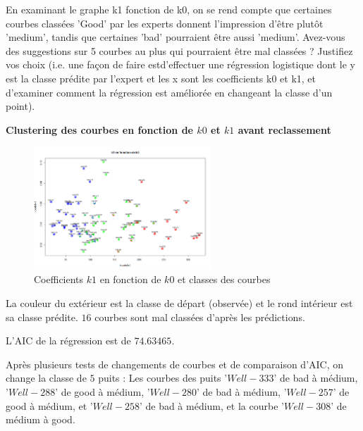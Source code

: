 \documentclass[12pt]{article}
\begin{document}
En examinant le graphe k1 fonction de k0, on se rend compte que certaines courbes
class\'ees 'Good' par les experts donnent l'impression d'\^etre plut\^ot 'medium', tandis que
certaines 'bad' pourraient \^etre aussi 'medium'. 
\newline
Avez-vous des suggestions sur 5 courbes au
plus qui pourraient \^etre mal class\'ees ? 
\newline
Justifiez vos choix (i.e. une fa\c con de faire estd'effectuer une r\'egression logistique dont le y est la classe pr\'edite par l'expert et les x sont
les coefficients k0 et k1, et d'examiner comment la r\'egression est am\'elior\'ee en changeant la
classe d'un point).

\textbf{Clustering des courbes en fonction de $k0$ et $k1$ avant reclassement}

\begin{figure}[H]
 \centering %
	\includegraphics[width=250px]{clustering}
  \caption{\label{fig:k0_k1} Coefficients $k1$ en fonction de $k0$ et classes des courbes}
\end{figure}

La couleur du ext\'erieur est la classe de d\'epart (observ\'ee) et le rond int\'erieur est sa classe pr\'edite.
\newline 
$16$ courbes sont mal class\'ees d'apr\`es les pr\'edictions.

L'AIC de la r\'egression est de $74.63465$. 

Apr\`es plusieurs tests de changements de courbes et de comparaison d'AIC, on change la classe de $5$ puits :
\newline
Les courbes des puits '$Well-333$' de bad à médium, '$Well-288$' de good à médium,
'$Well-280$' de bad à médium, '$Well-257$' de good à médium, et '$Well-258$' de bad à médium, et la courbe '$Well-308$' 
de médium à good.

\newpage 
\end{document}

